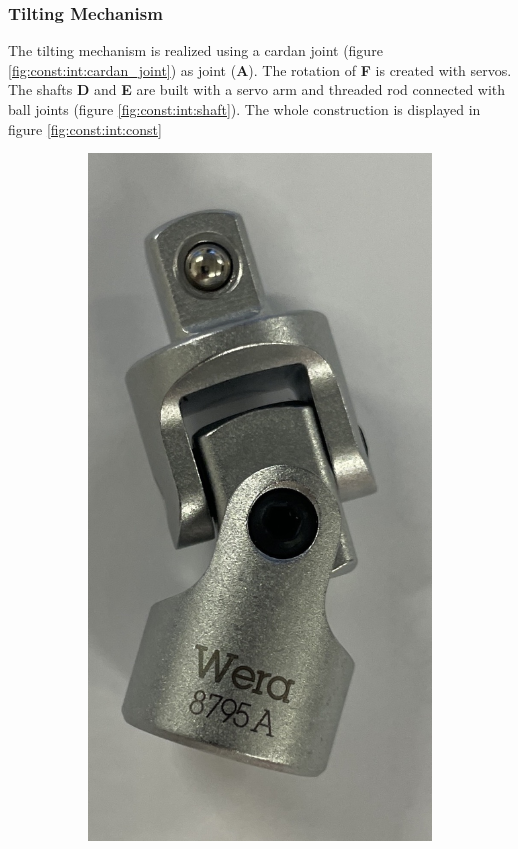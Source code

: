 \subsubsection*{Tilting Mechanism}

The tilting mechanism is realized using a cardan joint (figure \ref{fig:const:int:cardan_joint}) as joint (\textbf{A}). The rotation of \textbf{F} is created with servos. The shafts \textbf{D} and \textbf{E} are built with a servo arm and threaded rod connected with ball joints (figure \ref{fig:const:int:shaft}). The whole construction is displayed in figure \ref{fig:const:int:const}
%
\begin{figure}[ht]
  \begin{subfigure}[b]{0.174\textwidth}
    \includegraphics[width=\textwidth]{src/assets/pictures/construction/cardan_joint.JPG}

\end{subfigure}
\end{figure}
